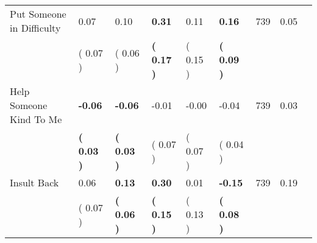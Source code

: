 \begin{tabular}{L{6.2cm} C{1.8cm} C{1.8cm} C{1.8cm} C{1.8cm} C{1.8cm} C{1.8cm} C{0.3cm} C{0.3cm}}
Put Someone in Difficulty &      0.07 &      0.10 & \textbf{     0.31} &      0.11 & \textbf{     0.16}  & 739 &       0.05 \\ 
 & (     0.07 ) & (     0.06 ) & \textbf{(     0.17 )} & (     0.15 ) & \textbf{(     0.09 )}  & \\
Help Someone Kind To Me & \textbf{    -0.06} & \textbf{    -0.06} &     -0.01 &     -0.00 &     -0.04  & 739 &       0.03 \\ 
 & \textbf{(     0.03 )} & \textbf{(     0.03 )} & (     0.07 ) & (     0.07 ) & (     0.04 )  & \\
Insult Back &      0.06 & \textbf{     0.13} & \textbf{     0.30} &      0.01 & \textbf{    -0.15}  & 739 &       0.19 \\ 
 & (     0.07 ) & \textbf{(     0.06 )} & \textbf{(     0.15 )} & (     0.13 ) & \textbf{(     0.08 )}  & \\
\bottomrule
\end{tabular}

